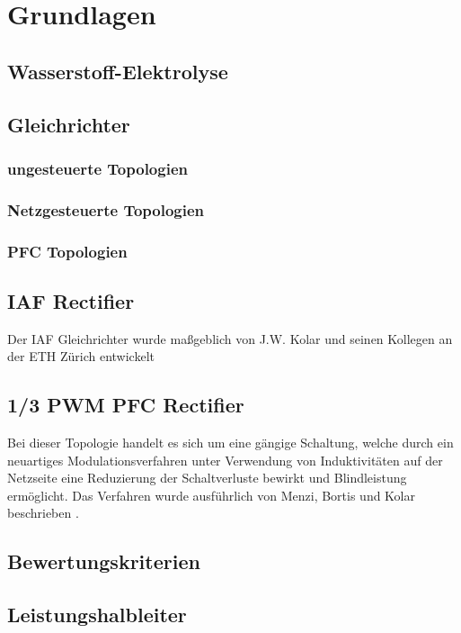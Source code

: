 \chapter{Grundlagen}


\section{Wasserstoff-Elektrolyse}

\section{Gleichrichter}

	\subsection{ungesteuerte Topologien}
	
	\subsection{Netzgesteuerte Topologien}
	
	\subsection{PFC Topologien}
	
\section{IAF Rectifier}
Der \gls{IAF} Gleichrichter wurde maßgeblich von J.W. Kolar und seinen Kollegen an der ETH Zürich entwickelt \cite{IAFcontrol}

\section{1/3 PWM PFC Rectifier}
Bei dieser Topologie handelt es sich um eine gängige Schaltung, welche durch ein neuartiges Modulationsverfahren unter Verwendung von Induktivitäten auf der Netzseite eine Reduzierung der Schaltverluste bewirkt und Blindleistung ermöglicht. Das Verfahren wurde ausführlich von Menzi, Bortis und Kolar beschrieben \cite{1/3PWMPFC}.
\section{Bewertungskriterien}

\section{Leistungshalbleiter}

